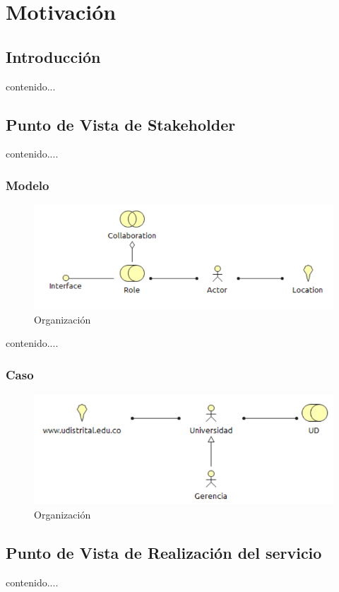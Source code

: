 \chapter{Motivación}
\section{Introducción}
contenido...
\newpage
\section{Punto de Vista de Stakeholder}
contenido....
\subsection{Modelo}
\begin{figure}[th!]
	\centering
	\includegraphics[width=0.8\linewidth]{arquitectura_diseno/imgs/M_Organizacion}
	\caption{Organización}
\end{figure}
\newpage
contenido....
\subsection{Caso}
\begin{figure}[th!]
	\centering
	\includegraphics[width=0.8\linewidth]{arquitectura_diseno/imgs/C_Organizacion}
	\caption{Organización}
\end{figure}
\newpage
\section{Punto de Vista de Realización del servicio}
contenido....
